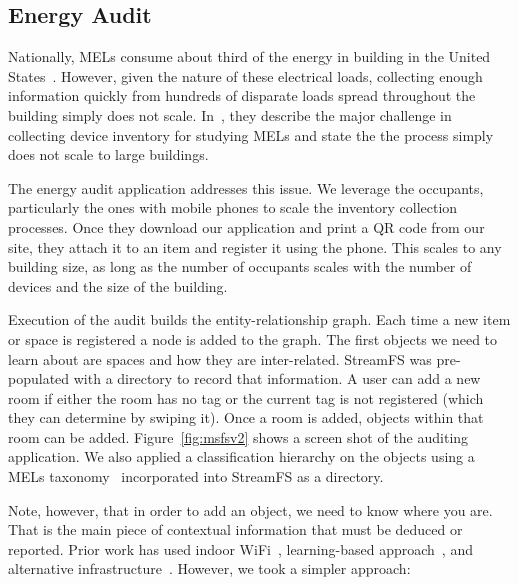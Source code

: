 
\subsection{Energy Audit}
\label{sec:eaudit}
Nationally, MELs consume about third of the energy in building in the United States~\cite{eia:2010}.  However,
given the nature of these electrical loads, collecting enough information quickly from hundreds of disparate
loads spread throughout the building simply does not scale.  In~\cite{lbnlmels}, they describe the major challenge
in collecting device inventory for studying MELs and state the the process simply does not scale to large buildings.

The energy audit application addresses this issue.  We leverage the occupants, particularly the ones with mobile phones
to scale the inventory collection processes.  Once they download our application and print a QR code from our site, they
attach it to an item and register it using the phone.  This scales to any building size, as long as the number of occupants
scales with the number of devices and the size of the building.

Execution of the audit builds the entity-relationship graph.  Each time a new item or space is registered a node is added
to the graph.  The first objects we need to learn about are spaces and how they are inter-related.  StreamFS
was pre-populated with a directory to record that information.  A user can add a new room if either the room has no tag
or the current tag is not registered (which they can determine by swiping it).  Once a room is added, objects within that
room can be added.  Figure~\ref{fig:msfsv2} shows a screen shot of the auditing application.  
We also applied a classification hierarchy on the objects using a MELs taxonomy~\cite{taxonomy}
incorporated into StreamFS as a directory.

Note, however, that in order to add an object, we need to know where you are.  That is the main piece of contextual information
that must be deduced or reported.  Prior work has used indoor WiFi~\cite{radar}, learning-based approach~\cite{wigem}, 
and alternative infrastructure~\cite{cricket}.  However, we took a simpler approach:

